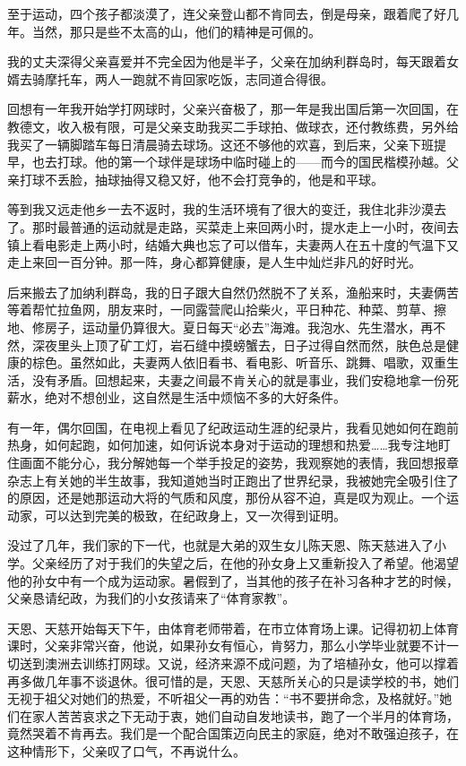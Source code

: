 \par 至于运动，四个孩子都淡漠了，连父亲登山都不肯同去，倒是母亲，跟着爬了好几年。当然，那只是些不太高的山，他们的精神是可佩的。
\par 我的丈夫深得父亲喜爱并不完全因为他是半子，父亲在加纳利群岛时，每天跟着女婿去骑摩托车，两人一跑就不肯回家吃饭，志同道合得很。
\par 回想有一年我开始学打网球时，父亲兴奋极了，那一年是我出国后第一次回国，在教德文，收入极有限，可是父亲支助我买二手球拍、做球衣，还付教练费，另外给我买了一辆脚踏车每日清晨骑去球场。这还不够他的欢喜，到后来，父亲下班提早，也去打球。他的第一个球伴是球场中临时碰上的——而今的国民楷模孙越。父亲打球不丢脸，抽球抽得又稳又好，他不会打竞争的，他是和平球。
\par 等到我又远走他乡一去不返时，我的生活环境有了很大的变迁，我住北非沙漠去了。那时最普通的运动就是走路，买菜走上来回两小时，提水走上一小时，夜间去镇上看电影走上两小时，结婚大典也忘了可以借车，夫妻两人在五十度的气温下又走上来回一百分钟。那一阵，身心都算健康，是人生中灿烂非凡的好时光。
\par 后来搬去了加纳利群岛，我的日子跟大自然仍然脱不了关系，渔船来时，夫妻俩苦等着帮忙拉鱼网，朋友来时，一同露营爬山拾柴火，平日种花、种菜、剪草、擦地、修房子，运动量仍算很大。夏日每天“必去”海滩。我泡水、先生潜水，再不然，深夜里头上顶了矿工灯，岩石缝中摸螃蟹去，日子过得自然而然，肤色总是健康的棕色。虽然如此，夫妻两人依旧看书、看电影、听音乐、跳舞、唱歌，双重生活，没有矛盾。回想起来，夫妻之间最不肯关心的就是事业，我们安稳地拿一份死薪水，绝对不想创业，这自然是生活中烦恼不多的大好条件。
\par 有一年，偶尔回国，在电视上看见了纪政运动生涯的纪录片，我看见她如何在跑前热身，如何起跑，如何加速，如何诉说本身对于运动的理想和热爱……我专注地盯住画面不能分心，我分解她每一个举手投足的姿势，我观察她的表情，我回想报章杂志上有关她的半生故事，我知道她当时正跑出了世界纪录，我被她完全吸引住了的原因，还是她那运动大将的气质和风度，那份从容不迫，真是叹为观止。一个运动家，可以达到完美的极致，在纪政身上，又一次得到证明。
\par 没过了几年，我们家的下一代，也就是大弟的双生女儿陈天恩、陈天慈进入了小学。父亲经历了对于我们的失望之后，在他的孙女身上又重新投入了希望。他渴望他的孙女中有一个成为运动家。暑假到了，当其他的孩子在补习各种才艺的时候，父亲恳请纪政，为我们的小女孩请来了“体育家教”。
\par 天恩、天慈开始每天下午，由体育老师带着，在市立体育场上课。记得初初上体育课时，父亲非常兴奋，他说，如果孙女有恒心，肯努力，那么小学毕业就要不计一切送到澳洲去训练打网球。又说，经济来源不成问题，为了培植孙女，他可以撑着再多做几年事不谈退休。很可惜的是，天恩、天慈所关心的只是读学校的书，她们无视于祖父对她们的热爱，不听祖父一再的劝告：“书不要拼命念，及格就好。”她们在家人苦苦哀求之下无动于衷，她们自动自发地读书，跑了一个半月的体育场，竟然哭着不肯再去。我们是一个配合国策迈向民主的家庭，绝对不敢强迫孩子，在这种情形下，父亲叹了口气，不再说什么。
